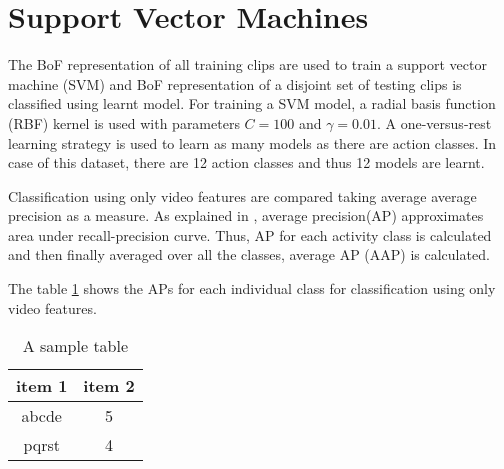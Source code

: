 \section{Support Vector Machines}
The BoF representation of all training clips are used to train a
support vector machine (SVM) and BoF representation of a disjoint set of testing clips is classified using
learnt model. For training a SVM model, a radial basis function (RBF) kernel is used with parameters $C = 100$ 
and $\gamma = 0.01$. A one-versus-rest learning strategy is used to learn as many models as there are action classes.
In case of this dataset, there are 12 action classes and thus 12 models are learnt.

Classification using only video features are compared taking  average average precision as a measure.
As explained in \cite{actionsInContext}, average precision(AP) approximates area under recall-precision curve.
Thus, AP for each activity class is calculated and then finally averaged over all the classes, average AP (AAP) is calculated.

The table \ref{table:AP_OnlyAction} shows the APs for each individual class for classification using only video features.

\begin{table}
\centering
\begin{tabular}{| c | c |}
\hline
{\bf item 1} & {\bf item 2} \\ \hline
%
abcde & 5 \\ \hline
%
pqrst & 4 \\ \hline
\end{tabular}
\caption{A sample table}
\label{table:AP_OnlyAction}
\end{table}


